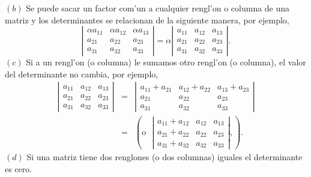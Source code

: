 \begin{propiedades}
$(b)$\;  Se puede sacar un factor com'un a cualquier rengl'on o columna de una 
matriz y los determinantes  se relacionan de la siguiente manera, por ejemplo, 
$$
     \left |\begin{array}{ccc}
                \alpha a_{11} & \alpha a_{12} &\alpha a_{13}\\[1mm]
                 a_{21} &  a_{22}&a_{23}\\[1mm]
		 a_{31} &  a_{32}&a_{33}
              \end{array}\right |= \alpha
     \left |\begin{array}{ccc}
                 a_{11} &  a_{12}&a_{13}\\[1mm]
                 a_{21} &  a_{22} &a_{23}\\[1mm]
		 a_{31} &  a_{32}&a_{33}
              \end{array}\right |.	      
$$
$(c)$\; Si a un rengl'on (o columna) le sumamos otro rengl'on (o
 columna), el valor del determinante no cambia, por ejemplo, 
\label{sumarenglonesdet}
\begin{eqnarray*}
     \left |\begin{array}{ccc}
                a_{11} &  a_{12} & a_{13}\\[1mm]
                 a_{21} &  a_{22}&a_{23}\\[1mm]
		 a_{31} &  a_{32}&a_{33}
              \end{array}\right | & = &
     \left |\begin{array}{ccc}
                 a_{11}+a_{21}  &  a_{12}+a_{22}  & a_{13}+a_{23} \\[1mm]
                 a_{21} &  a_{22}&a_{23}\\[1mm]
		 a_{31} &  a_{32}&a_{33}
              \end{array}\right |\\[1mm]
                         &=&    	\left ( \text{o} \ \ \
\left |\begin{array}{ccc}
                 a_{11}+a_{12} &  a_{12} & a_{13}\\[1mm]
                 a_{21}+a_{22} &  a_{22}&a_{23}\\[1mm]
		 a_{31}+a_{32} &  a_{32}&a_{33}
              \end{array}\right |, \right ).
\end{eqnarray*}	      	
$(d)$\; Si una matriz tiene dos renglones  (o dos columnas) iguales el
determinante es cero.
\end{propiedades}

